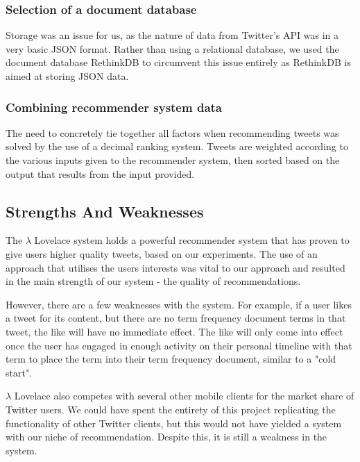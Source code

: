 \documentclass{article}
\begin{document}
\subsubsection*{Selection of a document database} %
Storage was an issue for us, as the nature of data from Twitter's API was in a very basic JSON format. Rather than using a relational database, we used the document database RethinkDB to circumvent this issue entirely as RethinkDB is aimed at storing JSON data.

\subsubsection*{Combining recommender system data} %
The need to concretely tie together all factors when recommending tweets was solved by the use of a decimal ranking system. Tweets are weighted according to the various inputs given to the recommender system, then sorted based on the output that results from the input provided.


\subsection{Strengths And Weaknesses} %
The $\lambda$ Lovelace system holds a powerful recommender system that has proven to give users higher quality tweets, based on our experiments. The use of an approach that utilises the users interests was vital to our approach and resulted in the main strength of our system - the quality of recommendations.

However, there are a few weaknesses with the system. For example, if a user likes a tweet for its content, but there are no term frequency document terms in that tweet, the like will have no immediate effect. The like will only come into effect once the user has engaged in enough activity on their personal timeline with that term to place the term into their term frequency document, similar to a "cold start". 

$\lambda$ Lovelace also competes with several other mobile clients for the market share of Twitter users. We could have spent the entirety of this project replicating the functionality of other Twitter clients, but this would not have yielded a system with our niche of recommendation. Despite this, it is still a weakness in the system.
\end{document}
